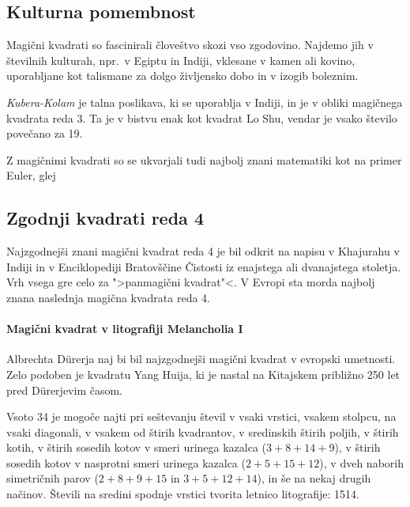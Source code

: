 \documentclass[a4paper,12pt]{article}
\begin{document}

\subsection{Kulturna pomembnost}

Magični kvadrati so fascinirali človeštvo skozi vso zgodovino. Najdemo jih
v številnih kulturah, npr.\ v Egiptu in Indiji, vklesane v kamen ali
kovino, uporabljane kot talismane za dolgo življensko dobo in v
izogib boleznim.

\emph{Kubera-Kolam} je talna poslikava, ki se uporablja v Indiji, in je v
obliki magičnega kvadrata reda 3. Ta je v bistvu enak kot kvadrat
Lo Shu, vendar je vsako število povečano za 19.

Z magičnimi kvadrati so se ukvarjali tudi najbolj znani matematiki kot na
primer Euler, glej \cite{euler} %


\subsection{Zgodnji kvadrati reda 4}

Najzgodnejši znani magični kvadrat reda 4 je bil odkrit na napisu
v Khajurahu v Indiji in v Enciklopediji Bratovščine Čistosti iz enajstega
ali dvanajstega stoletja. Vrh vsega gre celo za ">panmagični kvadrat"<.
V Evropi sta morda najbolj znana naslednja magična kvadrata reda 4.

\paragraph{Magični kvadrat v litografiji Melancholia I}
Albrechta Dürerja naj bi bil najzgodnejši magični kvadrat
v evropski umetnosti. Zelo podoben je kvadratu Yang Huija, ki je nastal na Kitajskem
približno 250 let pred Dürerjevim časom.

Vsoto 34 je mogoče najti pri seštevanju števil v vsaki vrstici, vsakem stolpcu,
na vsaki diagonali, v vsakem od štirih kvadrantov, v sredinskih štirih poljih,
v štirih kotih, v štirih sosedih kotov v smeri urinega kazalca (\(3+8+14+9\)), v
štirih sosedih kotov v nasprotni smeri urinega kazalca (\(2+5+15+12\)), v dveh naborih
simetričnih parov (\(2+8+9+15\) in \(3+5+12+14\)), in še na nekaj drugih načinov.
Števili na sredini spodnje vrstici tvorita letnico litografije: 1514.
\end{document}
